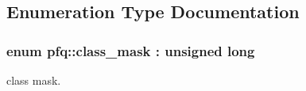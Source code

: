\subsection{Enumeration Type Documentation}
\hypertarget{namespacepfq_a96af1f5ed530eff563eb917516758fbb}{
\subsubsection[{class\+\_\+mask}]{\setlength{\rightskip}{0pt plus 5cm}enum {\bf pfq\+::class\+\_\+mask} \+: unsigned long\hspace{0.3cm}{\ttfamily [strong]}}}\label{namespacepfq_a96af1f5ed530eff563eb917516758fbb}


class mask. 

